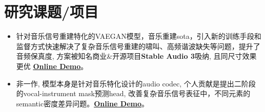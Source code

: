 \documentclass{resume}
\begin{document}
\section{研究课题/项目}



\begin{itemize}[parsep=0.2ex]
  \item 针对音乐信号重建特化的VAEGAN模型，音乐重建sota，引入新的训练手段和监督方式快速解决了复杂音乐信号重建的啸叫、高频谐波缺失等问题，提升了音频保真度, 方案被知名商业\&开源项目\textbf{Stable Audio 3}吸纳, 且同尺寸效果更优 \textbf{\href{https://eps-acoustic-revolution-lab.github.io/EAR_VAE/}{\uline{Online Demo}}}。
\end{itemize}

\begin{itemize}[parsep=0.2ex]
  \item 非一作, 模型本身是针对音乐特化设计的audio codec, 个人贡献是提出二阶段的vocal-instrument mask预测head, 改善复杂音乐信号表征中，不同元素的semantic密度差异问题。\textbf{\href{https://eps-acoustic-revolution-lab.github.io/DUO_TOK/}{\uline{Online Demo}}}。
\end{itemize}
\end{document}
